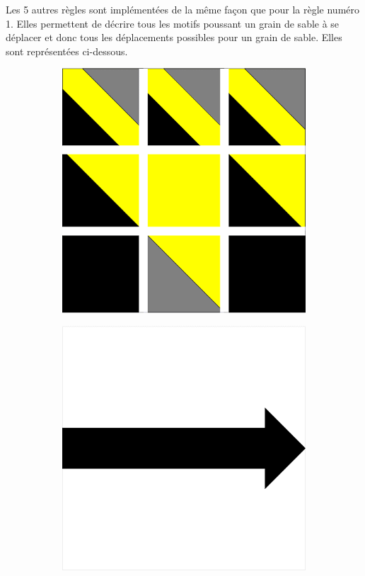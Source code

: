 \documentclass[a4paper]{article}
\begin{document}
Les 5 autres règles sont implémentées de la même façon que pour la règle numéro 1. Elles permettent de décrire tous les motifs poussant un grain de sable à se déplacer et donc tous les déplacements possibles pour un grain de sable. Elles sont représentées ci-dessous.
\\
\begin{figure}[!h]
    \centering
    \begin{subfigure}[t]{0.17\textwidth}
        \includegraphics[width=\textwidth]{img/rule20.png}
    \end{subfigure}
    \hfill
    \begin{subfigure}[t]{0.17\textwidth}
        \includegraphics[width=\textwidth]{img/fleche3.png}

\end{subfigure}
\end{figure}
\end{document}

